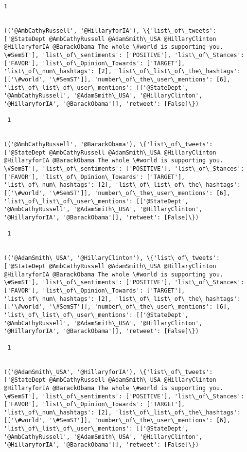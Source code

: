 \documentclass[11pt]{article}
\begin{document}
\begin{Verbatim}[commandchars=\\\{\}]
 1
 

(('@AmbCathyRussell', '@HillaryforIA'), \{'list\_of\_tweets': ['@StateDept @AmbCathyRussell @AdamSmith\_USA @HillaryClinton @HillaryforIA @BarackObama The whole \#world is supporting you. \#SemST'], 'list\_of\_sentiments': ['POSITIVE'], 'list\_of\_Stances': ['FAVOR'], 'list\_of\_Opinion\_Towards': ['TARGET'], 'list\_of\_num\_hashtags': [2], 'list\_of\_list\_of\_the\_hashtags': [['\#world', '\#SemST']], 'number\_of\_the\_user\_mentions': [6], 'list\_of\_list\_of\_user\_mentions': [['@StateDept', '@AmbCathyRussell', '@AdamSmith\_USA', '@HillaryClinton', '@HillaryforIA', '@BarackObama']], 'retweet': [False]\})

 1
 

(('@AmbCathyRussell', '@BarackObama'), \{'list\_of\_tweets': ['@StateDept @AmbCathyRussell @AdamSmith\_USA @HillaryClinton @HillaryforIA @BarackObama The whole \#world is supporting you. \#SemST'], 'list\_of\_sentiments': ['POSITIVE'], 'list\_of\_Stances': ['FAVOR'], 'list\_of\_Opinion\_Towards': ['TARGET'], 'list\_of\_num\_hashtags': [2], 'list\_of\_list\_of\_the\_hashtags': [['\#world', '\#SemST']], 'number\_of\_the\_user\_mentions': [6], 'list\_of\_list\_of\_user\_mentions': [['@StateDept', '@AmbCathyRussell', '@AdamSmith\_USA', '@HillaryClinton', '@HillaryforIA', '@BarackObama']], 'retweet': [False]\})

 1
 

(('@AdamSmith\_USA', '@HillaryClinton'), \{'list\_of\_tweets': ['@StateDept @AmbCathyRussell @AdamSmith\_USA @HillaryClinton @HillaryforIA @BarackObama The whole \#world is supporting you. \#SemST'], 'list\_of\_sentiments': ['POSITIVE'], 'list\_of\_Stances': ['FAVOR'], 'list\_of\_Opinion\_Towards': ['TARGET'], 'list\_of\_num\_hashtags': [2], 'list\_of\_list\_of\_the\_hashtags': [['\#world', '\#SemST']], 'number\_of\_the\_user\_mentions': [6], 'list\_of\_list\_of\_user\_mentions': [['@StateDept', '@AmbCathyRussell', '@AdamSmith\_USA', '@HillaryClinton', '@HillaryforIA', '@BarackObama']], 'retweet': [False]\})

 1
 

(('@AdamSmith\_USA', '@HillaryforIA'), \{'list\_of\_tweets': ['@StateDept @AmbCathyRussell @AdamSmith\_USA @HillaryClinton @HillaryforIA @BarackObama The whole \#world is supporting you. \#SemST'], 'list\_of\_sentiments': ['POSITIVE'], 'list\_of\_Stances': ['FAVOR'], 'list\_of\_Opinion\_Towards': ['TARGET'], 'list\_of\_num\_hashtags': [2], 'list\_of\_list\_of\_the\_hashtags': [['\#world', '\#SemST']], 'number\_of\_the\_user\_mentions': [6], 'list\_of\_list\_of\_user\_mentions': [['@StateDept', '@AmbCathyRussell', '@AdamSmith\_USA', '@HillaryClinton', '@HillaryforIA', '@BarackObama']], 'retweet': [False]\})


\end{Verbatim}
\end{document}

